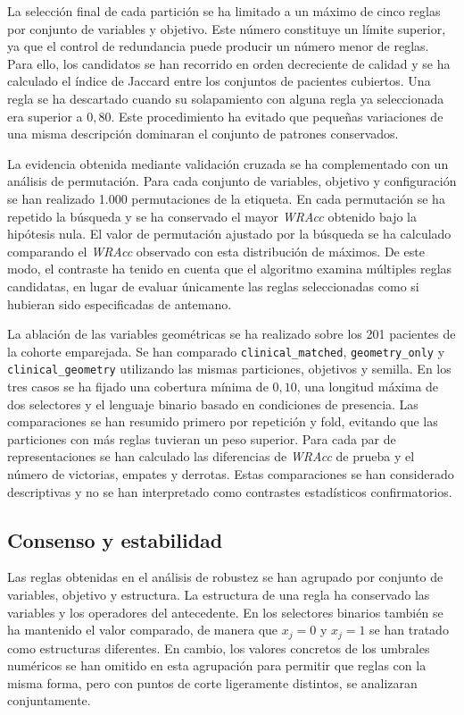 La selección final de cada partición se ha limitado a un máximo de cinco reglas por conjunto de variables y objetivo. Este número constituye un límite superior, ya que el control de redundancia puede producir un número menor de reglas. Para ello, los candidatos se han recorrido en orden decreciente de calidad y se ha calculado el índice de Jaccard entre los conjuntos de pacientes cubiertos. Una regla se ha descartado cuando su solapamiento con alguna regla ya seleccionada era superior a \(0{,}80\). Este procedimiento ha evitado que pequeñas variaciones de una misma descripción dominaran el conjunto de patrones conservados.

La evidencia obtenida mediante validación cruzada se ha complementado con un análisis de permutación. Para cada conjunto de variables, objetivo y configuración se han realizado 1.000 permutaciones de la etiqueta. En cada permutación se ha repetido la búsqueda y se ha conservado el mayor \textit{WRAcc} obtenido bajo la hipótesis nula. El valor de permutación ajustado por la búsqueda se ha calculado comparando el \textit{WRAcc} observado con esta distribución de máximos. De este modo, el contraste ha tenido en cuenta que el algoritmo examina múltiples reglas candidatas, en lugar de evaluar únicamente las reglas seleccionadas como si hubieran sido especificadas de antemano.

La ablación de las variables geométricas se ha realizado sobre los 201 pacientes de la cohorte emparejada. Se han comparado \texttt{clinical\_matched}, \texttt{geometry\_only} y \texttt{clinical\_geometry} utilizando las mismas particiones, objetivos y semilla. En los tres casos se ha fijado una cobertura mínima de \(0{,}10\), una longitud máxima de dos selectores y el lenguaje binario basado en condiciones de presencia. Las comparaciones se han resumido primero por repetición y fold, evitando que las particiones con más reglas tuvieran un peso superior. Para cada par de representaciones se han calculado las diferencias de \textit{WRAcc} de prueba y el número de victorias, empates y derrotas. Estas comparaciones se han considerado descriptivas y no se han interpretado como contrastes estadísticos confirmatorios.

\subsection{Consenso y estabilidad}

Las reglas obtenidas en el análisis de robustez se han agrupado por conjunto de variables, objetivo y estructura. La estructura de una regla ha conservado las variables y los operadores del antecedente. En los selectores binarios también se ha mantenido el valor comparado, de manera que \(x_j=0\) y \(x_j=1\) se han tratado como estructuras diferentes. En cambio, los valores concretos de los umbrales numéricos se han omitido en esta agrupación para permitir que reglas con la misma forma, pero con puntos de corte ligeramente distintos, se analizaran conjuntamente.

